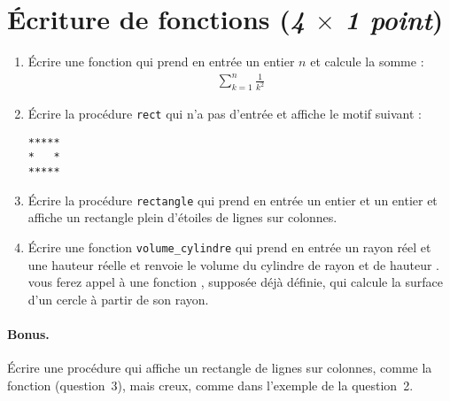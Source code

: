 \section{Écriture de fonctions (\textit{4 $\times$ 1 point})}

\begin{enumerate}
\item Écrire une fonction qui prend en entrée un entier $n$ et calcule
  la somme :\label{item:somme}
  \begin{gather*}
    \sum^n_{k = 1} \frac{1}{k^2}
  \end{gather*}

\item Écrire la procédure \verb|rect| qui n'a pas d'entrée et
  affiche le motif suivant :\label{item:rect}
\begin{verbatim}
*****
*   *
*****
\end{verbatim}
\item Écrire la procédure \verb|rectangle| qui prend en entrée un
  entier  et un entier  et affiche un rectangle plein
  d'étoiles de  lignes sur  colonnes. \label{item:rectangle}

\item Écrire une fonction \verb|volume_cylindre| qui prend en entrée
  un rayon réel  et une hauteur réelle  et renvoie le volume du cylindre
  de rayon   et de hauteur . vous ferez appel à une
  fonction , supposée déjà définie, qui calcule la
  surface d'un cercle à partir de son rayon.
\end{enumerate}

\paragraph{Bonus.}
Écrire une procédure  qui affiche un rectangle de 
lignes sur  colonnes, comme la fonction 
(question~3), mais creux, comme dans l'exemple de la question~2.

